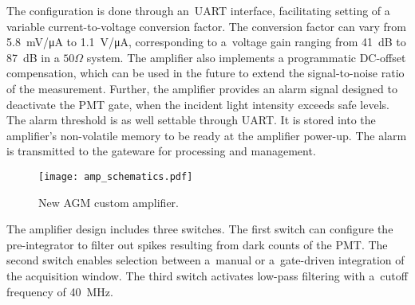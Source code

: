 The configuration is done through an~UART interface, facilitating
setting of a variable current-to-voltage conversion factor. The conversion factor can vary from
\SI{5.8}{mV/\micro A} to \SI{1.1}{V/\micro A}, corresponding to a~voltage gain ranging from \SI{41}{dB} to \SI{87}{dB} in a $50\Omega$ system. The amplifier also implements a programmatic DC-offset compensation, which can be used in the future to extend the signal-to-noise ratio of the measurement. Further, the amplifier provides an alarm signal designed to
deactivate the PMT gate, when the incident light intensity exceeds safe levels. The alarm threshold is as well settable through UART. It is stored into the amplifier's non-volatile memory to be ready at the amplifier power-up. The alarm is transmitted to the gateware for processing and management.

\begin{figure}[!tbh]
    \centering
    \texttt{[image: amp\_schematics.pdf]}
    \caption{New AGM custom amplifier.}
    \label{fig:amp_schematics}
\end{figure}

The amplifier design includes three switches. The first switch can configure
the pre-integrator to filter out spikes resulting from dark counts of the PMT.
The second switch enables selection between a~manual or a~gate-driven integration
of the acquisition window. The third switch activates low-pass filtering with a~cutoff frequency of \SI{40}{MHz}.

